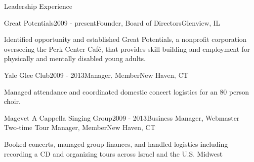 \documentclass{resume} %
\begin{document}
\begin{rSection}{Leadership Experience}

\begin{rSubsection}{Great Potentials}{2009 - present}{Founder, Board of Directors}{Glenview, IL}
\item Identified opportunity and established Great Potentials, a nonprofit corporation overseeing the Perk Center Caf\'{e}, that provides skill building and employment for physically and mentally disabled young adults.
\end{rSubsection}


\begin{rSubsection}{Yale Glee Club}{2009 - 2013}{Manager, Member}{New Haven, CT}
\item Managed attendance and coordinated domestic concert logistics for an 80 person choir.
\end{rSubsection}


\begin{rSubsection}{Magevet A Cappella Singing Group}{2009 - 2013}{Business Manager, Webmaster Two-time Tour Manager, Member}{New Haven, CT}
\item Booked concerts, managed group finances, and handled logistics including recording a CD and organizing tours across Israel and the U.S. Midwest
\end{rSubsection}


\end{rSection}
\end{document}
